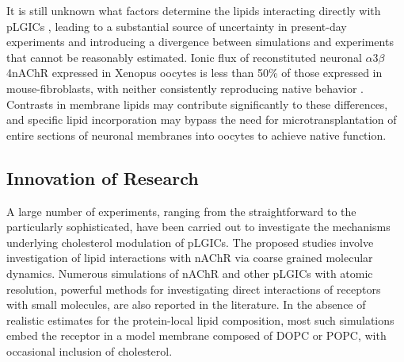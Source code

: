 \documentclass{article}
\begin{document}
It is still unknown what factors determine the lipids interacting directly with pLGICs , leading to a substantial source of uncertainty in present-day experiments and introducing a divergence between simulations and experiments that cannot be reasonably estimated. Ionic flux of reconstituted neuronal $\alpha$3$\beta$4nAChR expressed in Xenopus oocytes is less than 50\% of those expressed in mouse-fibroblasts, with neither consistently reproducing native behavior \cite{Fong_Correlation_1986,Sunshine_Lipid_1992,Hamouda_Assessing_2006,Butler_FTIR_1993,Bhushan_Correlation_1993,Fong_Stabilization_1987,Bednarczyk_Transmembrane_2002,Corrie_Lipid_2002}. Contrasts in membrane lipids may contribute significantly to these differences, and specific lipid incorporation may bypass the need for microtransplantation of entire sections of neuronal membranes \cite{Conti2013} into oocytes to achieve native function.

\subsection{Innovation of Research}

A large number of experiments, ranging from the straightforward to the particularly sophisticated, have been carried out to investigate the mechanisms underlying cholesterol modulation of pLGICs. The proposed studies involve investigation of lipid interactions with nAChR via coarse grained molecular dynamics. Numerous simulations of nAChR and other pLGICs with atomic resolution, powerful methods for investigating direct interactions of receptors with small molecules, are also reported in the literature. In the absence of realistic estimates for the protein-local lipid composition, most such simulations embed the receptor in a model membrane composed of DOPC or POPC, with occasional inclusion of cholesterol.
\end{document}
